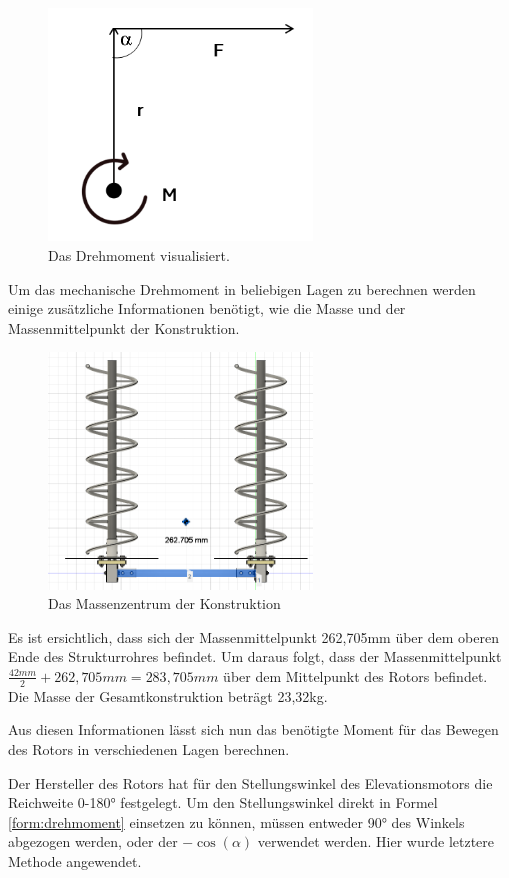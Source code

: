 \begin{figure}[h!]
	\centering
	\includegraphics[width=7cm]{../ref/Drehmoment.png}
	\caption{Das Drehmoment visualisiert.}
	\label{fig:mechanische-moment}
\end{figure}

Um das mechanische Drehmoment in beliebigen Lagen zu berechnen werden einige zusätzliche Informationen benötigt, wie die Masse und der Massenmittelpunkt der Konstruktion.

\begin{figure}[h!]
	\centering
	\includegraphics[width=7cm]{../ref/Massenmittelpunkt.png}
	\caption{Das Massenzentrum der Konstruktion}
	\label{fig:massenmittelpunkt}
\end{figure}

Es ist ersichtlich, dass sich der Massenmittelpunkt 262,705mm über dem oberen Ende des Strukturrohres befindet. Um daraus folgt, dass der Massenmittelpunkt $\frac{42mm}{2}+262,705mm=283,705mm$ über dem Mittelpunkt des Rotors befindet. Die Masse der Gesamtkonstruktion beträgt 23,32kg.

Aus diesen Informationen lässt sich nun das benötigte Moment für das Bewegen des Rotors in verschiedenen Lagen berechnen.

Der Hersteller des Rotors hat für den Stellungswinkel des Elevationsmotors die Reichweite 0-180° festgelegt. Um den Stellungswinkel direkt in Formel \ref{form:drehmoment} einsetzen zu können, müssen entweder 90° des Winkels abgezogen werden, oder der $-\cos(\alpha)$ verwendet werden. Hier wurde letztere Methode angewendet.

